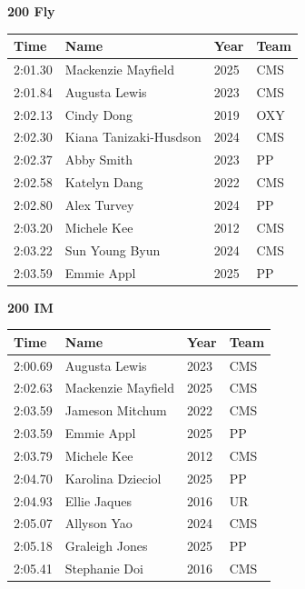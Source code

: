 \vspace{1.2em}
\noindent\begin{minipage}[t]{0.98\textwidth}
\centering
\textbf{\textcolor{teamprimary}{200 Fly}}\par
\vspace{0.5em}
\centering
\small
\renewcommand{\arraystretch}{1.0}
\setlength{\tabcolsep}{4pt}
\begin{tabular}{@{}p{2.5cm}p{4.5cm}p{1.5cm}p{2.5cm}@{}}
\toprule
\textbf{Time} & \textbf{Name} & \textbf{Year} & \textbf{Team} \\
\midrule
2:01.30 & Mackenzie Mayfield & 2025 & CMS \\
2:01.84 & Augusta Lewis & 2023 & CMS \\
2:02.13 & Cindy Dong & 2019 & OXY \\
2:02.30 & Kiana Tanizaki-Husdson & 2024 & CMS \\
2:02.37 & Abby Smith & 2023 & PP \\
2:02.58 & Katelyn Dang & 2022 & CMS \\
2:02.80 & Alex Turvey & 2024 & PP \\
2:03.20 & Michele Kee & 2012 & CMS \\
2:03.22 & Sun Young Byun & 2024 & CMS \\
2:03.59 & Emmie Appl & 2025 & PP \\
\bottomrule
\end{tabular}
\end{minipage}
\vspace{1.2em}
\noindent\begin{minipage}[t]{0.98\textwidth}
\centering
\textbf{\textcolor{teamprimary}{200 IM}}\par
\vspace{0.5em}
\centering
\small
\renewcommand{\arraystretch}{1.0}
\setlength{\tabcolsep}{4pt}
\begin{tabular}{@{}p{2.5cm}p{4.5cm}p{1.5cm}p{2.5cm}@{}}
\toprule
\textbf{Time} & \textbf{Name} & \textbf{Year} & \textbf{Team} \\
\midrule
2:00.69 & Augusta Lewis & 2023 & CMS \\
2:02.63 & Mackenzie Mayfield & 2025 & CMS \\
2:03.59 & Jameson Mitchum & 2022 & CMS \\
2:03.59 & Emmie Appl & 2025 & PP \\
2:03.79 & Michele Kee & 2012 & CMS \\
2:04.70 & Karolina Dzieciol & 2025 & PP \\
2:04.93 & Ellie Jaques & 2016 & UR \\
2:05.07 & Allyson Yao & 2024 & CMS \\
2:05.18 & Graleigh Jones & 2025 & PP \\
2:05.41 & Stephanie Doi & 2016 & CMS \\
\bottomrule
\end{tabular}
\end{minipage}
